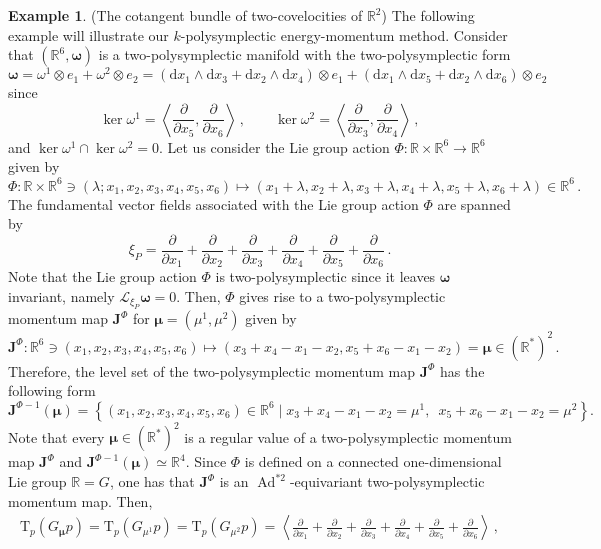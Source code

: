 \documentclass[11pt]{article}
\theoremstyle{plain}
\theoremstyle{definition}
\newtheorem{example}[theorem]{Example}
\newcommand{\R}{\mathbb{R}}
\newcommand{\T}{\mathrm{T}}
\newcommand{\cT}{\mathrm{T}^\ast}
\newcommand{\bomega}{{\boldsymbol{\omega}}}
\renewcommand{\d}{\mathrm{d}}
\newcommand{\Lie}{\mathscr{L}}
\DeclareMathOperator{\Ad}{Ad}
\def\d{\mathrm{d}}
\numberwithin{equation}{section}
\begin{document}
\begin{example}{(The cotangent bundle of two-covelocities of $\R^2$)}
The following example will illustrate our $k$-polysymplectic energy-momentum method. %
Consider that $(\mathbb{R}^6,\boldsymbol{\omega})$ is a two-polysymplectic manifold with the two-polysymplectic form
\[
\bomega=\omega^1\otimes e_1+\omega^2\otimes e_2=\left(\d x_1\wedge \d x_3 + \d x_2\wedge \d x_4\right)\otimes e_1+\left(\d x_1\wedge \d x_5 + \d x_2\wedge \d x_6\right)\otimes e_2\,
\]
since
\[
\ker\omega^1=\left\langle \frac{\partial}{\partial x_5},\frac{\partial}{\partial x_6}\right\rangle \,,\qquad\ker\omega^2=\left\langle \frac{\partial}{\partial x_3},\frac{\partial}{\partial x_4}\right\rangle \,,
\]
and $\ker\omega^1\cap\ker\omega^2=0$.
Let us consider the Lie group action $\Phi:\R\times \R^6\rightarrow \R^6$ given by
\[
\Phi:\mathbb{R}\times\mathbb{R}^6\ni(\lambda;x_1,x_2,x_3,x_4,x_5,x_6)\longmapsto (x_1+\lambda,x_2+\lambda,x_3+\lambda, x_4+\lambda,x_5+\lambda,x_6+\lambda)\in\mathbb{R}^6\,.
\]
The fundamental vector fields associated with the Lie group action $\Phi$ are spanned by
\[
    \xi_P=\frac{\partial}{\partial x_1}+\frac{\partial}{\partial x_2}+\frac{\partial}{\partial x_3}+\frac{\partial}{\partial x_4}+\frac{\partial}{\partial x_5}+\frac{\partial}{\partial x_6}\,.
\]
Note that the Lie group action $\Phi$ is two-polysymplectic since it leaves $\bomega$ invariant, namely $\Lie_{\xi_P}\bomega = 0$. Then, $\Phi$ gives rise to a two-polysymplectic momentum map $\mathbf{J}^\Phi$ for $\bm \mu=(\mu^1,\mu^2)$ given by
\[
    \mathbf{J}^\Phi:\mathbb{R}^6\ni(x_1,x_2,x_3,x_4,x_5,x_6)\longmapsto (x_3+x_4-x_1-x_2,x_5+x_6-x_1-x_2)=\boldsymbol{\mu}\in (\mathbb{R}^*)^2\,.
\]
Therefore, the level set of the two-polysymplectic momentum map $\mathbf{J}^\Phi$ has the following form 
\begin{equation}
\label{Eq::ExMomentumMap1}
\mathbf{J}^{\Phi-1}(\boldsymbol{\mu})=\left\{ (x_1,x_2,x_3,x_4,x_5,x_6)\!\in\!\mathbb{R}^6\mid x_3\!+\!x_4\!-\!x_1\!-\!x_2=\mu^1,\,\,\,x_5\!+\!x_6\!-\!x_1\!-\!x_2\!=\mu^2\right\}.
\end{equation}
Note that every $\boldsymbol{\mu}\in(\mathbb{R}^*)^2$ is a regular value of a two-polysymplectic momentum map $\mathbf{J}^\Phi$ and  $\mathbf{J}^{\Phi-1}(\boldsymbol{\mu})\simeq \mathbb{R}^4$. Since $\Phi$ is defined on a connected one-dimensional Lie group $\mathbb{R}=G$, one has that $\mathbf{J}^\Phi$ is an $\Ad^{*2}$-equivariant two-polysymplectic momentum map. Then,
\begin{gather*}
\T_p(G_{\boldsymbol{\mu}}p) = \T_p(G_{\mu^1}p) = \T_p(G_{\mu^2}p)=\left\langle \frac{\partial}{\partial x_1}+\frac{\partial}{\partial x_2}+\frac{\partial}{\partial x_3}+\frac{\partial}{\partial x_4}+\frac{\partial}{\partial x_5}+\frac{\partial}{\partial x_6} \right\rangle \,,\\

\end{gather*}
\end{example}
\end{document}
